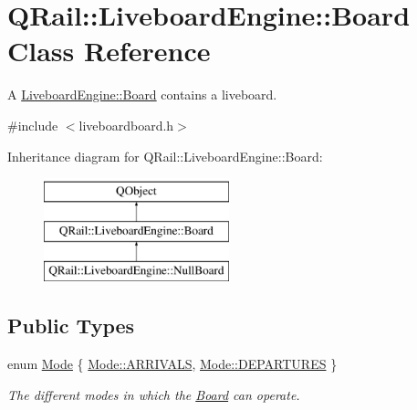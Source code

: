 \hypertarget{classQRail_1_1LiveboardEngine_1_1Board}{}\section{Q\+Rail\+::Liveboard\+Engine\+::Board Class Reference}
\label{classQRail_1_1LiveboardEngine_1_1Board}


A \mbox{\hyperlink{classQRail_1_1LiveboardEngine_1_1Board}{Liveboard\+Engine\+::\+Board}} contains a liveboard.  




{\ttfamily \#include $<$liveboardboard.\+h$>$}

Inheritance diagram for Q\+Rail\+::Liveboard\+Engine\+::Board\+:\begin{figure}[H]
\begin{center}
\leavevmode
\includegraphics[height=3.000000cm]{classQRail_1_1LiveboardEngine_1_1Board}
\end{center}
\end{figure}
\subsection*{Public Types}
\begin{DoxyCompactItemize}
\item 
enum \mbox{\hyperlink{classQRail_1_1LiveboardEngine_1_1Board_a0ab6d318f405895f62c6e98cb2d86c6e}{Mode}} \{ \mbox{\hyperlink{classQRail_1_1LiveboardEngine_1_1Board_a0ab6d318f405895f62c6e98cb2d86c6ea2906f1567c46a28f5a256a77e6aca76a}{Mode\+::\+A\+R\+R\+I\+V\+A\+LS}}, 
\mbox{\hyperlink{classQRail_1_1LiveboardEngine_1_1Board_a0ab6d318f405895f62c6e98cb2d86c6ea560e6dfa758a32c703224545b841a386}{Mode\+::\+D\+E\+P\+A\+R\+T\+U\+R\+ES}}
 \}
\begin{DoxyCompactList}\small\item\em The different modes in which the \mbox{\hyperlink{classQRail_1_1LiveboardEngine_1_1Board}{Board}} can operate. \end{DoxyCompactList}\end{DoxyCompactItemize}
